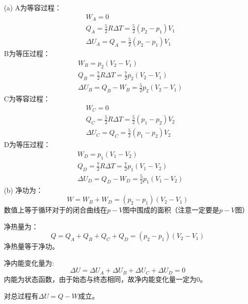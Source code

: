 \begin{solution}
        (a) A为等容过程：
        \begin{equation*}
            \begin{aligned}
                &W_A = 0\\
                &Q_A = \frac{5}{2}R\Delta T = \frac{5}{2}(p_{2}-p_{1})V_1\\
                &\Delta U_A = Q_A = \frac{5}{2}(p_{2}-p_{1})V_1
            \end{aligned}
        \end{equation*}
        B为等压过程：
        \begin{equation*}
            \begin{aligned}
                &W_B = p_2(V_2 - V_1)\\
                &Q_B = \frac{7}{2}R\Delta T = \frac{7}{2}p_{2}(V_2 - V_1)\\
                &\Delta U_B = Q_B - W_B = \frac{5}{2}p_{2}(V_2 - V_1)
            \end{aligned}
        \end{equation*}
        C为等容过程：
        \begin{equation*}
            \begin{aligned}
                &W_C = 0\\
                &Q_C = \frac{5}{2}R\Delta T = \frac{5}{2}(p_{1}-p_{2})V_2\\
                &\Delta U_C = Q_C = \frac{5}{2}(p_{1}-p_{2})V_2
            \end{aligned}
        \end{equation*}
        D为等压过程：
        \begin{equation*}
            \begin{aligned}
                &W_D = p_1(V_1 - V_2)\\
                &Q_D = \frac{7}{2}R\Delta T = \frac{7}{2}p_{1}(V_1 - V_2)\\
                &\Delta U_D = Q_D - W_D = \frac{5}{2}p_{1}(V_1 - V_2)
            \end{aligned}
        \end{equation*}
        (b) 净功为：
        \begin{equation*}
            W = W_B + W_D = (p_2 - p_1)(V_2 - V_1)
        \end{equation*}
        数值上等于循环对于的闭合曲线在$p-V$图中围成的面积（注意一定要是$p-V$图）

        净热量为：
        \begin{equation*}
            Q = Q_A + Q_B + Q_C + Q_D = (p_2 - p_1)(V_2 - V_1)
        \end{equation*}
        净热量等于净功。

        净内能变化量为:
        \begin{equation*}
            \Delta U = \Delta U_A + \Delta U_B + \Delta U_C + \Delta U_D = 0 
        \end{equation*}
        内能为状态函数，由于始态与终态相同，故净内能变化量一定为0。

        对总过程有$\Delta U = Q - W$成立。
    \end{solution}
